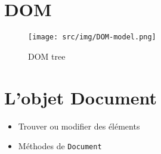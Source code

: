 \hypertarget{dom-1}{%
\section{DOM}\label{dom-1}}

\begin{english}

\begin{Shaded}
\begin{Highlighting}[]
    \KeywordTok{\textgreater{}}
\end{Highlighting}
\end{Shaded}

\end{english}

\begin{figure}
\centering
\texttt{[image: src/img/DOM-model.png]}
\caption{DOM tree}
\end{figure}

\hypertarget{lobjet-document}{%
\section{L'objet Document}\label{lobjet-document}}

\begin{itemize}
\tightlist
\item
  Trouver ou modifier des éléments
\item
  Méthodes de \textenglish{\texttt{Document}}
\end{itemize}

\begin{english}

\begin{Shaded}
\begin{Highlighting}[]
    \NormalTok{()}\OperatorTok{,} \NormalTok{()}\OperatorTok{,} \NormalTok{()}\OperatorTok{,}  
    \NormalTok{()}\OperatorTok{,} \NormalTok{()}
\end{Highlighting}
\end{Shaded}

\end{english}

